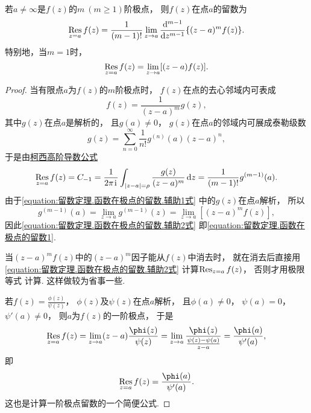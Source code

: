 \begin{property}
若\(a\neq\infty\)是\(f(z)\)的\(m\ (m\geq1)\)阶极点，
则\(f(z)\)在点\(a\)的留数为
\begin{equation}\label{equation:留数定理.函数在极点的留数1}
	\operatorname*{Res}_{z=a} f(z)
	= \frac{1}{(m-1)!} \lim_{z \to a} \dv[m-1]{z} \{ (z-a)^m f(z) \}.
\end{equation}
特别地，当\(m=1\)时，
\begin{equation}\label{equation:留数定理.函数在极点的留数2}
	\operatorname*{Res}_{z=a} f(z)
	= \lim_{z \to a} [(z-a) f(z)].
\end{equation}
\begin{proof}
当有限点\(a\)为\(f(z)\)的\(m\)阶极点时，
\(f(z)\)在点的去心邻域内可表成
\begin{equation}\label{equation:留数定理.函数在极点的留数.辅助1式}
	f(z) = \frac{1}{(z-a)^m} g(z),
\end{equation}
其中\(g(z)\)在点\(a\)是解析的，
且\(g(a)\neq0\)，
\(g(z)\)在点\(a\)的邻域内可展成泰勒级数\[
	g(z) = \sum_{n=0}^\infty \frac{1}{n!} g^{(n)}(a) (z-a)^n,
\]
于是由\hyperref[equation:解析函数的积分表示.柯西高阶导数公式]{柯西高阶导数公式}
\begin{equation}\label{equation:留数定理.函数在极点的留数.辅助2式}
	\operatorname*{Res}_{z=a} f(z) = C_{-1}
	= \frac{1}{2\pi\kern1pt\mathrm{i}\kern1pt} \int_{\abs{z-a}=\rho} \frac{g(z)}{(z-a)^m} \dd{z}
	= \frac{1}{(m-1)!} g^{(m-1)}(a).
\end{equation}
由于\cref{equation:留数定理.函数在极点的留数.辅助1式} 中的\(g(z)\)在点\(a\)解析，
所以\[
	g^{(m-1)}(a) = \lim_{z \to a} g^{(m-1)}(z)
	= \lim_{z \to a} [(z-a)^m f(z)],
\]
因此\cref{equation:留数定理.函数在极点的留数.辅助2式}
即\cref{equation:留数定理.函数在极点的留数1}.

当\((z-a)^m f(z)\)中的\((z-a)^m\)因子能从\(f(z)\)中消去时，
就在消去后直接用\cref{equation:留数定理.函数在极点的留数.辅助2式}
计算\(\operatorname*{Res}_{z=a} f(z)\)，
否则才用极限等式  计算.
这样做较为省事一些.

若\(f(z) = \frac{\phi(z)}{\psi(z)}\)，
\(\phi(z)\)及\(\psi(z)\)在点\(a\)解析，
且\(\phi(a)\neq0\)，
\(\psi(a)=0\)，
\(\psi'(a)\neq0\)，
则\(a\)为\(f(z)\)的一阶极点，
于是\[
	\Res_{z=a} f(z)
	= \lim_{z \to a} (z-a) \frac{\phi(z)}{\psi(z)}
	= \lim_{z \to a} \frac{\phi(z)}{\frac{\psi(z)-\psi(a)}{z-a}}
	= \frac{\phi(a)}{\psi'(a)},
\]
即\begin{equation}\label{equation:留数定理.函数在极点的留数3}
	\Res_{z=a} f(z)
	= \frac{\phi(a)}{\psi'(a)}.
\end{equation}
这也是计算一阶极点留数的一个简便公式.
\end{proof}
\end{property}


